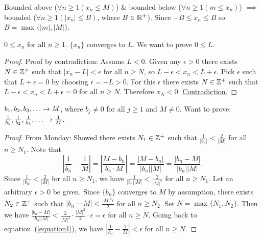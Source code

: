 \documentclass[]{article}
\begin{document}
Bounded above ($\forall n\geq1(x_n\leq M)$) \& bounded below ($\forall n\geq 1(m\leq x_n)$) $\implies $ bounded ($\forall n\geq 1(|x_n|\leq B)$, where $B\in\mathbb{R}^+$). Since $-B\leq x_n \leq B$ so $B=\max{\{|m|,|M|\}}$.
\begin{example}
	[Exam 1, 8.] $0\leq x_n$ for all $n\geq 1$. $\{x_n\}$ converges to $L$. We want to prove \ul{$0\leq L$}. 
\end{example}
\begin{proof}
	Proof by contradiction: Assume $L<0$. Given any $\epsilon>0$ there exists $N\in\mathbb{Z}^+$ such that $|x_n - L|<\epsilon$ for all $n\geq N$, so $L-\epsilon<x_n<L+\epsilon$. Pick $\epsilon$ such that $L+\epsilon=0$ by choosing $\epsilon=-L>0$. For this $\epsilon$ there exists $N\in \mathbb{Z}^+$ such that $L-\epsilon<x_n<L+\epsilon=0$ for all $n\geq N$. Therefore $x_N<0$. \ul{Contradiction}.
\end{proof}
\begin{recall}
	$b_1, b_2, b_3,\dots \ra M$, where $b_j \neq 0$ for all $j\geq 1$ and $M\neq0$. Want to prove: $\frac{1}{b_1},\frac{1}{b_2},\frac{1}{b_3},\dots \ra \frac{1}{M}$. 
\end{recall}
\begin{proof}
	From Monday: Showed there exists $N_1 \in \mathbb{Z}^+$ such that $\frac{1}{|b_n|}<\frac{2}{|M|}$ for all $n\geq N_1$. Note that
	\begin{equation}
		\left|\frac{1}{b_n}-\frac{1}{M}\right| = \left| \frac{M-b_n}{b_n\cdot M}\right| = \frac{|M-b_n|}{|b_n||M|} = \frac{|b_n-M|}{|b_n||M|}.
		\label{equation1}
	\end{equation}
	Since $\frac{1}{|b_n|}<\frac{2}{|M|}$ %
	for all $n\geq N_1$, we have %
	$\frac{1}{|b_n||M|} < \frac{2}{|M|^2}$ for all $n\geq N_1$.
	Let an arbitrary $\epsilon>0$ be given. Since $\{b_n\}$ converges to $M$ by assumption, there exists $N_2\in \mathbb{Z}^+$ such that $|b_n-M|<\frac{|M|^2\epsilon}{2}$ for all $n\geq N_2$. 
	Set $N=\max{\{N_1,N_2\}}$. Then we have $\frac{|b_n-M|}{|b_n||M|}<\frac{2}{|M|^2} \cdot \frac{|M|^2}{2}\cdot \epsilon = \epsilon$ for all $n\geq N$. Going back to equation~(\ref{equation1}), we have
	$\left| \frac{1}{b_n}-\frac{1}{M} \right| < \epsilon$ for all $n\geq N$.
\end{proof}
\end{document}
